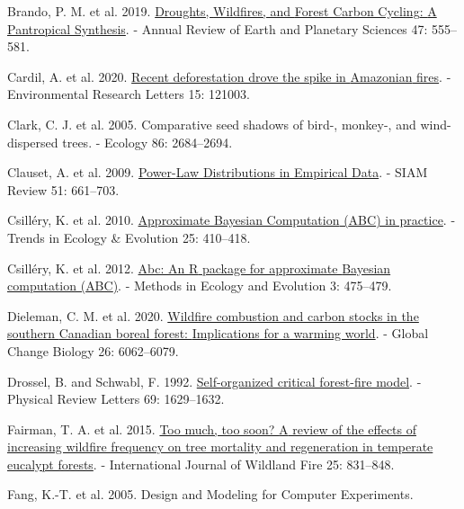 \documentclass[
]{article}
\newlength{\cslhangindent}
\newenvironment{CSLReferences}[2] %
 {\begin{list}{}{%
  \setlength{\itemindent}{0pt}
  \setlength{\leftmargin}{0pt}
  \setlength{\parsep}{0pt}
  \ifodd #1
   \setlength{\leftmargin}{\cslhangindent}
   \setlength{\itemindent}{-1\cslhangindent}
  \fi
  \setlength{\itemsep}{#2\baselineskip}}}
 {\end{list}}
\begin{document}
\begin{CSLReferences}{1}{1}
Brando, P. M. et al. 2019.
\href{https://doi.org/10.1146/annurev-earth-082517-010235}{Droughts,
{Wildfires}, and {Forest Carbon Cycling}: {A Pantropical Synthesis}}. -
Annual Review of Earth and Planetary Sciences 47: 555--581.

Cardil, A. et al. 2020.
\href{https://doi.org/10.1088/1748-9326/abcac7}{Recent deforestation
drove the spike in {Amazonian} fires}. - Environmental Research Letters
15: 121003.

Clark, C. J. et al. 2005. Comparative seed shadows of bird-, monkey-,
and wind-dispersed trees. - Ecology 86: 2684--2694.

Clauset, A. et al. 2009.
\href{https://doi.org/10.1137/070710111}{Power-{Law Distributions} in
{Empirical Data}}. - SIAM Review 51: 661--703.

Csilléry, K. et al. 2010.
\href{http://dx.doi.org/10.1016/j.tree.2010.04.001}{Approximate
{Bayesian Computation} ({ABC}) in practice}. - Trends in Ecology \&
Evolution 25: 410--418.

Csilléry, K. et al. 2012.
\href{https://doi.org/10.1111/j.2041-210X.2011.00179.x}{Abc: An {R}
package for approximate {Bayesian} computation ({ABC})}. - Methods in
Ecology and Evolution 3: 475--479.

Dieleman, C. M. et al. 2020.
\href{https://doi.org/10.1111/gcb.15158}{Wildfire combustion and carbon
stocks in the southern {Canadian} boreal forest: {Implications} for a
warming world}. - Global Change Biology 26: 6062--6079.

Drossel, B. and Schwabl, F. 1992.
\href{https://doi.org/10.1103/PhysRevLett.69.1629}{Self-organized
critical forest-fire model}. - Physical Review Letters 69: 1629--1632.

Fairman, T. A. et al. 2015. \href{https://doi.org/10.1071/WF15010}{Too
much, too soon? {A} review of the effects of increasing wildfire
frequency on tree mortality and regeneration in temperate eucalypt
forests}. - International Journal of Wildland Fire 25: 831--848.

Fang, K.-T. et al. 2005. {Design and Modeling for Computer Experiments}.


\end{CSLReferences}
\end{document}
